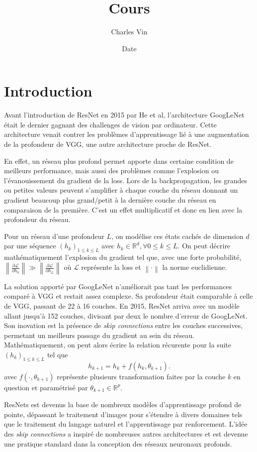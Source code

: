 \documentclass{report}
\title{Cours}
\author{Charles Vin}
\date{Date}
\theoremstyle{plain}%
\theoremstyle{definition}
\theoremstyle{remark}
\begin{document}
\chapter{Introduction}
Avant l'introduction de ResNet en 2015 par He et al, l'architecture GoogLeNet était le dernier gagnant des challenges de vision par ordinateur. Cette architecture venait contrer les problèmes d'apprentissage lié à une augmentation de la profondeur de VGG, une autre architecture proche de ResNet. 

En effet, un réseau plus profond permet apporte dans certaine condition de meilleurs performance, mais aussi des problèmes comme l'explosion ou l'évanouissement du gradient de la loss. Lors de la backpropagation, les grandes ou petites valeurs peuvent s'amplifier à chaque couche du réseau donnant un gradient beaucoup plus grand/petit à la dernière couche du réseau en comparaison de la première. C'est un effet multiplicatif et donc en lien avec la profondeur du réseau.

Pour un réseau d'une profondeur $ L $, on modélise ces états cachés de dimension $ d $  par une séquence $ (h_k)_{1 \leq k \leq L} $ avec $ h_k \in \mathbb{R}^d, \forall 0 \leq k \leq L $. On peut décrire mathématiquement l'explosion du gradient tel que, avec une forte probabilité, $ \left\| \frac{\partial \mathcal{L}}{\partial h_0} \right\|  \gg  \left\| \frac{\partial \mathcal{L}}{\partial h_L} \right\|  $ où $ \mathcal{L} $ représente la loss et $ \left\| \cdot  \right\|  $ la norme euclidienne.


La solution apporté par GoogLeNet n'améliorait pas tant les performances comparé à VGG et restait assez complexe. Sa profondeur était comparable à celle de VGG, passant de 22 à 16 couches. En 2015, ResNet arriva avec un modèle allant jusqu'à 152 couches, divisant par deux le nombre d'erreur de GoogLeNet. Son inovation est la présence de \textit{skip connections} entre les couches successives, permetant un meilleurs passage du gradient au sein du réseau. Mathématiquement, on peut alors écrire la relation récurente pour la suite $ (h_k)_{1 \leq k \leq L} $ tel que 
\[
    h_{k+1 } = h_k + f(h_k, \theta _{k+1})
.\]
avec $ f(\cdot , \theta _{k+1}) $ représente plusieurs transformation faites par la couche $ k $ en question et paramétrisé par $ \theta _{k+1} \in \mathbb{R}^p $.

ResNets est devenus la base de nombreux modèles d'apprentissage profond de pointe, dépassant le traitement d'images pour s'étendre à divers domaines tels que le traitement du langage naturel et l'apprentissage par renforcement. L'idée des \textit{skip connections} a inspiré de nombreuses autres architectures et est devenue une pratique standard dans la conception des réseaux neuronaux profonds.
\end{document}
